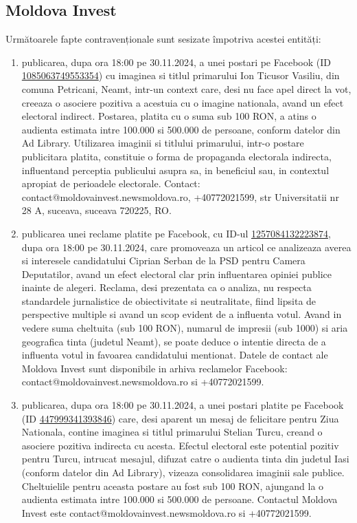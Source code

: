 \documentclass[a4paper,12pt]{article}
\begin{document}
\vspace{0.5cm}

\subsection{Moldova Invest}
Următoarele fapte contravenționale sunt sesizate împotriva acestei entități:

\begin{enumerate}[leftmargin=*, label=\arabic*.)]
    \item publicarea, dupa ora 18:00 pe 30.11.2024, a unei postari pe Facebook (ID \href{https://www.facebook.com/ads/library/?id=1085063749553354}{1085063749553354}) cu imaginea si titlul primarului Ion Ticusor Vasiliu, din comuna Petricani, Neamt, intr-un context care, desi nu face apel direct la vot, creeaza o asociere pozitiva a acestuia cu o imagine nationala, avand un efect electoral indirect.  Postarea, platita cu o suma sub 100 RON, a atins o audienta estimata intre 100.000 si 500.000 de persoane, conform datelor din Ad Library.  Utilizarea imaginii si titlului primarului, intr-o postare publicitara platita,  constituie o forma de propaganda electorala indirecta, influentand perceptia publicului asupra sa, in beneficiul sau, in contextul apropiat de perioadele electorale.  Contact: contact@moldovainvest.newsmoldova.ro, +40772021599, str Universitatii nr 28 A, suceava, suceava 720225, RO.
    \item publicarea unei reclame platite pe Facebook, cu ID-ul \href{https://www.facebook.com/ads/library/?id=1257084132223874}{1257084132223874}, dupa ora 18:00 pe 30.11.2024, care promoveaza un articol ce analizeaza averea si interesele candidatului Ciprian Serban de la PSD pentru Camera Deputatilor, avand un efect electoral clar prin influentarea opiniei publice inainte de alegeri.  Reclama, desi prezentata ca o analiza, nu respecta standardele jurnalistice de obiectivitate si neutralitate, fiind lipsita de perspective multiple si avand un scop evident de a influenta votul.  Avand in vedere suma cheltuita (sub 100 RON), numarul de impresii (sub 1000) si aria geografica tinta (judetul Neamt), se poate deduce o intentie directa de a influenta votul in favoarea candidatului mentionat.  Datele de contact ale Moldova Invest sunt disponibile in arhiva reclamelor Facebook: contact@moldovainvest.newsmoldova.ro si +40772021599.
    \item publicarea, dupa ora 18:00 pe 30.11.2024, a unei postari platite pe Facebook (ID \href{https://www.facebook.com/ads/library/?id=447999341393846}{447999341393846}) care, desi aparent un mesaj de felicitare pentru Ziua Nationala, contine imaginea si titlul primarului Stelian Turcu, creand o asociere pozitiva indirecta cu acesta.  Efectul electoral este potential pozitiv pentru Turcu, intrucat mesajul, difuzat catre o audienta tinta din judetul Iasi (conform datelor din Ad Library),  vizeaza consolidarea imaginii sale publice.  Cheltuielile pentru aceasta postare au fost sub 100 RON, ajungand la o audienta estimata intre 100.000 si 500.000 de persoane.  Contactul Moldova Invest este contact@moldovainvest.newsmoldova.ro si +40772021599.

\end{enumerate}
\end{document}
